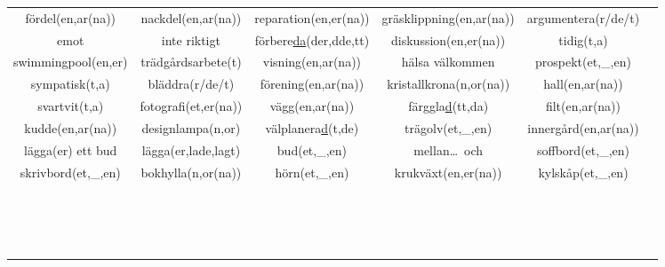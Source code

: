 \begin{center}
\begin{adjustwidth}{-2.5cm}{}
\begin{tabular}{|c c c c c c|}
            fördel(en,ar(na)) & nackdel(en,ar(na)) & reparation(en,er(na)) & gräsklippning(en,ar(na)) & argumentera(r/de/t) &  \\
            emot & inte riktigt & förbere\underline{da}(der,dde,tt) & diskussion(en,er(na)) & tidig(t,a) &  \\
            swimmingpool(en,er) & trädgårdsarbete(t) & visning(en,ar(na)) & hälsa välkommen & prospekt(et,\_,en) &  \\
            sympatisk(t,a) & bläddra(r/de/t) & förening(en,ar(na)) & kristallkrona(n,or(na)) & hall(en,ar(na)) &  \\
            svartvit(t,a) & fotografi(et,er(na)) & vägg(en,ar(na)) & färggla\underline{d}(tt,da) & filt(en,ar(na)) &  \\
            kudde(en,ar(na)) & designlampa(n,or) & välplanera\underline{d}(t,de) & trägolv(et,\_,en) & innergård(en,ar(na)) &  \\
            lägga(er) ett bud & lägga(er,lade,lagt) & bud(et,\_,en) & mellan\ldots\ och & soffbord(et,\_,en) &  \\
            skrivbord(et,\_,en) & bokhylla(n,or(na)) & hörn(et,\_,en) & krukväxt(en,er(na)) & kylskåp(et,\_,en) &  \\
             &  &  &  &  &  \\
             &  &  &  &  &  \\
             &  &  &  &  &  \\
             &  &  &  &  &  \\
             &  &  &  &  &  \\
             &  &  &  &  &  \\
             &  &  &  &  &  \\
             &  &  &  &  &  \\
             &  &  &  &  &  \\
             &  &  &  &  &  \\
             &  &  &  &  &  \\
             &  &  &  &  &  \\
             &  &  &  &  &  \\
             &  &  &  &  &  \\
             &  &  &  &  &  \\
             &  &  &  &  &  \\
            \hline
        \end{tabular}
    \end{adjustwidth}
\end{center}

